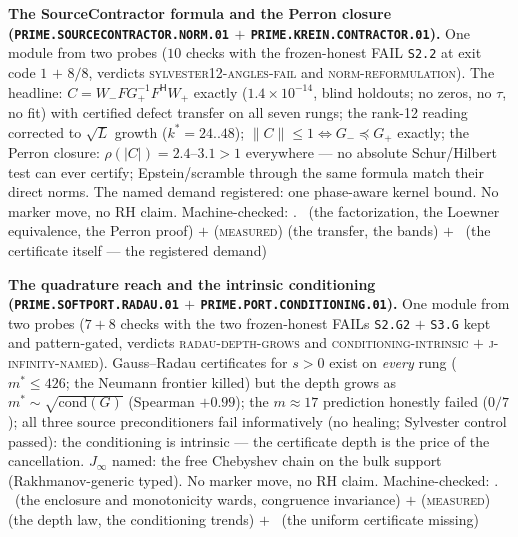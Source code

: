 \documentclass[11pt,a4paper]{article}
\theoremstyle{definition}
\begin{document}
\par\smallskip\noindent\textbf{The SourceContractor formula and
the Perron closure
(\texttt{PRIME.SOURCECONTRACTOR.\allowbreak NORM.01} $+$
\texttt{PRIME.KREIN.\allowbreak CONTRACTOR.01}).}
One module from two probes ($10$ checks with the frozen-honest
FAIL \texttt{S2.2} at exit code $1$ $+$ $8/8$, verdicts
\textsc{sylvester12-angles-fail} and
\textsc{norm-reformulation}).  The headline: $C =
W_-FG_+^{-1}F^{\mathsf H}W_+$ exactly ($1.4\times10^{-14}$,
blind holdouts; no zeros, no $\tau$, no fit) with certified
defect transfer on all seven rungs; the rank-12 reading
corrected to $\sqrt{L}$ growth ($k^* = 24..48$); $\|C\| \le 1
\Leftrightarrow G_- \preceq G_+$ exactly; the Perron closure:
$\rho(|C|) = 2.4$--$3.1 > 1$ everywhere --- no absolute
Schur/Hilbert test can ever certify; Epstein/scramble through
the same formula match their direct norms.  The named demand
registered: one phase-aware kernel bound.  No marker move, no
RH claim.
Machine-checked: .
\mE\ (the factorization, the Loewner equivalence, the Perron
proof) $+$ (\textsc{measured}) (the transfer, the bands) $+$
\mO\ (the certificate itself --- the registered demand)
\par\smallskip

\par\smallskip\noindent\textbf{The quadrature reach and the
intrinsic conditioning
(\texttt{PRIME.SOFTPORT.\allowbreak RADAU.01} $+$
\texttt{PRIME.PORT.\allowbreak CONDITIONING.01}).}
One module from two probes ($7 + 8$ checks with the two
frozen-honest FAILs \texttt{S2.G2} $+$ \texttt{S3.G} kept and
pattern-gated, verdicts \textsc{radau-depth-grows} and
\textsc{conditioning-intrinsic} $+$
\textsc{j-infinity-named}).  Gauss--Radau certificates for $s >
0$ exist on \emph{every} rung ($m^* \le 426$; the Neumann
frontier killed) but the depth grows as $m^* \sim
\sqrt{\mathrm{cond}(G)}$ (Spearman $+0.99$); the $m \approx 17$
prediction honestly failed ($0/7$); all three source
preconditioners fail informatively (no healing; Sylvester
control passed): the conditioning is intrinsic --- the
certificate depth is the price of the cancellation.  $J_\infty$
named: the free Chebyshev chain on the bulk support
(Rakhmanov-generic typed).  No marker move, no RH claim.
Machine-checked: .
\mE\ (the enclosure and monotonicity wards, congruence
invariance) $+$ (\textsc{measured}) (the depth law, the
conditioning trends) $+$ \mO\ (the uniform certificate missing)
\par\smallskip
\end{document}
